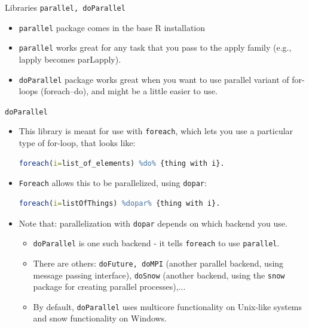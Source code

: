 \documentclass[compress,xcolor=table]{beamer}
\newcommand{\pp}{\pause}
\begin{document}
\begin{frame}{Libraries {\tt parallel, doParallel}}
	\begin{itemize}
		\item {\tt parallel} package comes in the base R installation
		\item {\tt parallel} works great for any task that you pass to  the apply family (e.g., lapply becomes parLapply). 
		\item {\tt doParallel} package works great when you want to use parallel variant of for-loops (foreach--do), and might be a little easier to use.
	\end{itemize}
\end{frame}







\begin{frame}[fragile]{{\tt doParallel}}
\begin{itemize}\small 
\item 	This library 
	is meant for use with {\tt foreach}, which lets you use a particular type of for-loop, that looks like:
	\begin{lstlisting}[basicstyle=\color{blue}\tiny\ttfamily,language=R,escapeinside=`']
		foreach(i=list_of_elements) %do% {thing with i}.
	\end{lstlisting}
	\pp 
	\item 
	{\tt Foreach} allows this to be parallelized, using {\tt dopar}:
	\begin{lstlisting}[basicstyle=\color{blue}\tiny\ttfamily,language=R,escapeinside=`']
		foreach(i=listOfThings) %dopar% {thing with i}.
	\end{lstlisting}
	\pp 
	\item Note that: 
	parallelization with {\tt dopar} depends on which backend you use. 
	\begin{itemize}
		\item 
		{\tt doParallel} is one such backend - it tells {\tt foreach} to use {\tt parallel}. 
		\item There are others:  {\tt doFuture, doMPI} (another parallel backend, using message passing interface), {\tt doSnow} (another backend, using the {\tt  snow} package for creating parallel processes),...
		\item By default, {\tt doParallel} uses multicore functionality on Unix-like systems and snow functionality on Windows.
		
	\end{itemize}
\end{itemize}

\end{frame}
\end{document}
